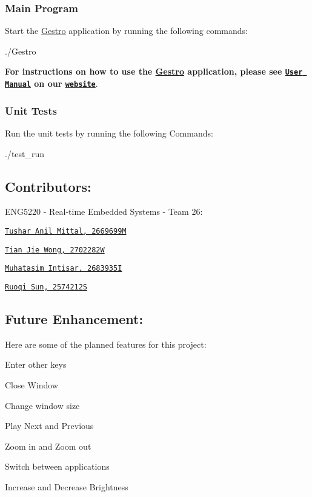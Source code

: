\subsubsection*{Main Program}

Start the \hyperlink{namespace_gestro}{Gestro} application by running the following commands\+:


\begin{DoxyCode}
./Gestro
\end{DoxyCode}
 {\bfseries For instructions on how to use the \hyperlink{namespace_gestro}{Gestro} application, please see \href{https://randomguy-coder.github.io/Gestro/user_manual.html}{\tt User Manual} on our \href{https://randomguy-coder.github.io/Gestro/}{\tt website}}.

\subsubsection*{Unit Tests}

Run the unit tests by running the following Commands\+: 
\begin{DoxyCode}
./test\_run
\end{DoxyCode}


\subsection*{Contributors\+:}

E\+N\+G5220 -\/ Real-\/time Embedded Systems -\/ Team 26\+:
\begin{DoxyItemize}
\item \href{https://github.com/RandomGuy-coder}{\tt Tushar Anil Mittal, 2669699M}
\item \href{https://github.com/terrsoshi}{\tt Tian Jie Wong, 2702282W}
\item \href{https://github.com/MuhatasimIntisar}{\tt Muhatasim Intisar, 2683935I}
\item \href{https://github.com/David2574}{\tt Ruoqi Sun, 2574212S}
\end{DoxyItemize}

\subsection*{Future Enhancement\+:}

Here are some of the planned features for this project\+:
\begin{DoxyItemize}
\item Enter other keys
\item Close Window
\item Change window size
\item Play Next and Previous
\item Zoom in and Zoom out
\item Switch between applications
\item Increase and Decrease Brightness
\end{DoxyItemize}


